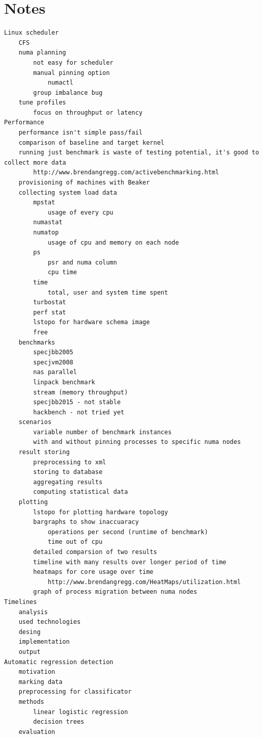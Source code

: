 \chapter{Notes}
\begin{verbatim}
Linux scheduler
    CFS
    numa planning
        not easy for scheduler
        manual pinning option
            numactl
        group imbalance bug
    tune profiles
        focus on throughput or latency
Performance
    performance isn't simple pass/fail
    comparison of baseline and target kernel
    running just benchmark is waste of testing potential, it's good to collect more data
        http://www.brendangregg.com/activebenchmarking.html
    provisioning of machines with Beaker
    collecting system load data
        mpstat
            usage of every cpu
        numastat
        numatop
            usage of cpu and memory on each node
        ps
            psr and numa column
            cpu time
        time
            total, user and system time spent
        turbostat
        perf stat
        lstopo for hardware schema image
        free
    benchmarks
        specjbb2005
        specjvm2008
        nas parallel
        linpack benchmark
        stream (memory throughput)
        specjbb2015 - not stable
        hackbench - not tried yet
    scenarios
        variable number of benchmark instances
        with and without pinning processes to specific numa nodes
    result storing
        preprocessing to xml
        storing to database
        aggregating results
        computing statistical data
    plotting
        lstopo for plotting hardware topology
        bargraphs to show inaccuaracy
            operations per second (runtime of benchmark)
            time out of cpu
        detailed comparsion of two results
        timeline with many results over longer period of time
        heatmaps for core usage over time
            http://www.brendangregg.com/HeatMaps/utilization.html
        graph of process migration between numa nodes
Timelines
    analysis
    used technologies
    desing
    implementation
    output
Automatic regression detection
    motivation
    marking data
    preprocessing for classificator
    methods
        linear logistic regression
        decision trees
    evaluation
\end{verbatim}

